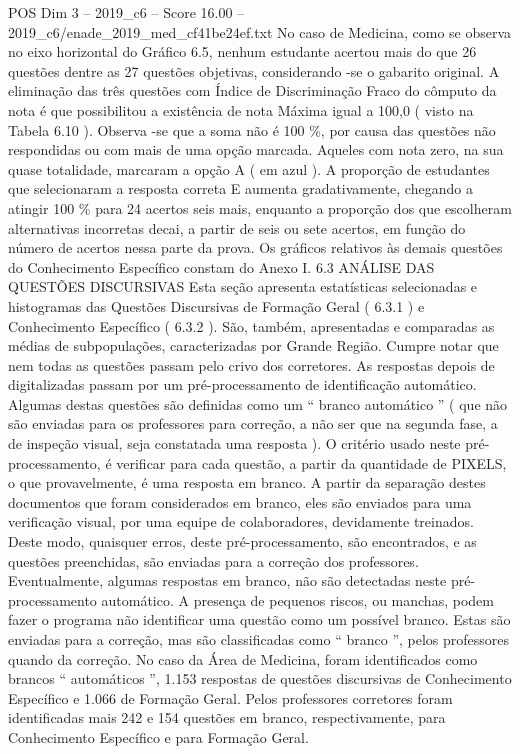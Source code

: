 \begin{textsample}{POS Dim 3 – 2019\_c6 – Score 16.00 – 2019\_c6/enade\_2019\_med\_cf41be24ef.txt}
No caso de Medicina, como se observa no eixo horizontal do Gráfico 6.5, nenhum estudante acertou mais do que 26 questões dentre as 27 questões objetivas, considerando -se o gabarito original.
A eliminação das três questões com Índice de Discriminação Fraco do cômputo da nota é que possibilitou a existência de nota Máxima igual a 100,0 ( visto na Tabela 6.10 ).
Observa -se que a soma não é 100 \%, por causa das questões não respondidas ou com mais de uma opção marcada.
Aqueles com nota zero, na sua quase totalidade, marcaram a opção A ( em azul ).
A proporção de estudantes que selecionaram a resposta correta E aumenta gradativamente, chegando a atingir 100 \% para 24 acertos seis mais, enquanto a proporção dos que escolheram alternativas incorretas decai, a partir de seis ou sete acertos, em função do número de acertos nessa parte da prova.
Os gráficos relativos às demais questões do Conhecimento Específico constam do Anexo I. 6.3 ANÁLISE DAS QUESTÕES DISCURSIVAS Esta seção apresenta estatísticas selecionadas e histogramas das Questões Discursivas de Formação Geral ( 6.3.1 ) e Conhecimento Específico ( 6.3.2 ).
São, também, apresentadas e comparadas as médias de subpopulações, caracterizadas por Grande Região.
Cumpre notar que nem todas as questões passam pelo crivo dos corretores.
As respostas depois de digitalizadas passam por um pré-processamento de identificação automático.
Algumas destas questões são definidas como um “ branco automático ” ( que não são enviadas para os professores para correção, a não ser que na segunda fase, a de inspeção visual, seja constatada uma resposta ).
O critério usado neste pré-processamento, é verificar para cada questão, a partir da quantidade de PIXELS, o que provavelmente, é uma resposta em branco.
A partir da separação destes documentos que foram considerados em branco, eles são enviados para uma verificação visual, por uma equipe de colaboradores, devidamente treinados.
Deste modo, quaisquer erros, deste pré-processamento, são encontrados, e as questões preenchidas, são enviadas para a correção dos professores.
Eventualmente, algumas respostas em branco, não são detectadas neste pré-processamento automático.
A presença de pequenos riscos, ou manchas, podem fazer o programa não identificar uma questão como um possível branco.
Estas são enviadas para a correção, mas são classificadas como “ branco ”, pelos professores quando da correção.
No caso da Área de Medicina, foram identificados como brancos “ automáticos ”, 1.153 respostas de questões discursivas de Conhecimento Específico e 1.066 de Formação Geral.
Pelos professores corretores foram identificadas mais 242 e 154 questões em branco, respectivamente, para Conhecimento Específico e para Formação Geral.

\end{textsample}
